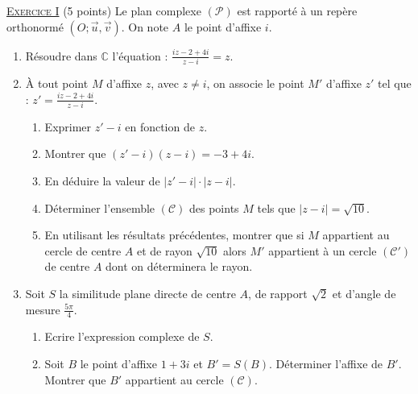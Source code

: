\providecommand{\Courbe}{(\mathscr{C})}
\providecommand{\CourbeP}{(\mathscr{C'})}
\providecommand{\D}{(\mathscr{D})}
\providecommand{\Plan}{(\mathscr{P})}
\providecommand{\Ouv}{(O ; \vec{u} , \vec{v})}
\providecommand{\cm}{~\mathrm{cm}}
\providecommand{\dx}{~\mathrm{d}x}
\providecommand{\Arg}[1]{\mathrm{Arg}\left( #1 \right)}
\providecommand{\Angl}[2]{\left( \overrightarrow{#1} ; \overrightarrow{#2} \right)}
\noindent \underline{\textsc{Exercice I}} (5 points) \newline
      Le plan complexe $\Plan$ est rapport\'e \`a un rep\`ere orthonorm\'e $\Ouv$.
      On note $A$ le point d'affixe $i$.
      \begin{enumerate}
            \item R\'esoudre dans $\mathbb{C}$ l'\'equation : $\frac{i z - 2 + 4 i}{z - i} = z$.
            \item \`A tout point $M$ d'affixe $z$, avec $z \neq i$, on associe le point $M'$ d'affixe $z'$ tel que :
                  $z' = \frac{iz - 2 + 4i}{z - i}$.
                  \begin{enumerate}
                        \item Exprimer $z'-i$ en fonction de $z$.
                        \item Montrer que $(z' - i)(z-i) = -3 + 4i$.
                        \item En d\'eduire la valeur de $|z'-i| \cdot |z-i|$.
                        \item D\'eterminer l'ensemble $\Courbe$ des points $M$ tels que $|z-i| = \sqrt{10}$.
                        \item En utilisant les r\'esultats pr\'ec\'edentes, montrer que si $M$ appartient au cercle de centre $A$
                              et de rayon $\sqrt{10}$ alors $M'$ appartient \`a un cercle $\CourbeP$ de centre $A$ dont on 
                              d\'eterminera le rayon.
                  \end{enumerate}
            \item Soit $S$ la similitude plane directe de centre $A$, de rapport $\sqrt{2}$ et d'angle de mesure $\frac{5\pi}{4}$.
                  \begin{enumerate}
                        \item Ecrire l'expression complexe de $S$.
                        \item Soit $B$ le point d'affixe $1+3i$ et $B' = S(B)$.
                              D\'eterminer l'affixe de $B'$.
                              Montrer que $B'$ appartient au cercle $\Courbe$.
                  \end{enumerate}
      \end{enumerate}
